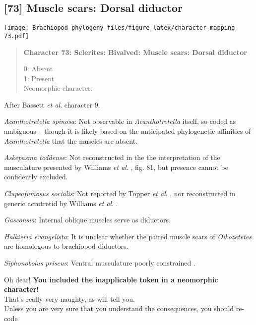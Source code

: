 \documentclass[openany]{book}
\theoremstyle{definition}
\theoremstyle{definition}
\theoremstyle{definition}
\theoremstyle{remark}
\begin{document}
\subsection*{{[}73{]} Muscle scars: Dorsal
diductor}\label{muscle-scars-dorsal-diductor}

\texttt{[image: Brachiopod\_phylogeny\_files/figure-latex/character-mapping-73.pdf]}

\begin{quote}
\textbf{Character 73: Sclerites: Bivalved: Muscle scars: Dorsal
diductor}

0: Absent\\
1: Present\\
Neomorphic character.
\end{quote}

After Bassett \emph{et al}.
\citeyearpar{Bassett2001Functionalmorphology} character 9.

\hypertarget{Acanthotretella_spinosa-coding-73}{}
\emph{Acanthotretella spinosa}: Not observable in \emph{Acanthotretella}
itself, so coded as ambiguous -- though it is likely based on the
anticipated phylogenetic affinities of \emph{Acanthotretella} that the
muscles are absent.

\hypertarget{Askepasma_toddense-coding-73}{}
\emph{Askepasma toddense}: Not reconstructed in the the interpretation
of the musculature presented by Williams \emph{et al}.
\citeyearpar{Williams2000LinguliformeaCraniiformea}, fig. 81, but
presence cannot be confidently excluded.

\hypertarget{Clupeafumosus_socialis-coding-73}{}
\emph{Clupeafumosus socialis}: Not reported by Topper \emph{et al}.
\citeyearpar{Topper2013Reappraisalof}, nor reconstructed in generic
acrotretid by Williams \emph{et al}.
\citeyearpar{Williams2000LinguliformeaCraniiformea}.

\hypertarget{Gasconsia-coding-73}{}
\emph{Gasconsia}: Internal oblique muscles serve as diductors.

\hypertarget{Halkieria_evangelista-coding-73}{}
\emph{Halkieria evangelista}: It is unclear whether the paired muscle
scars of \emph{Oikozetetes} are homologous to brachiopod diductors.

\hypertarget{Siphonobolus_priscus-coding-73}{}
\emph{Siphonobolus priscus}: Ventral musculature poorly constrained
\citep{Williams2000LinguliformeaCraniiformea, Popov2009Earlyontogeny}.

Oh dear! \textbf{You included the inapplicable token in a neomorphic
character!}\\
That's really very naughty, as \citet{Brazeau2018} will tell you.\\
Unless you are very sure that you understand the consequences, you
should re-code
\end{document}

